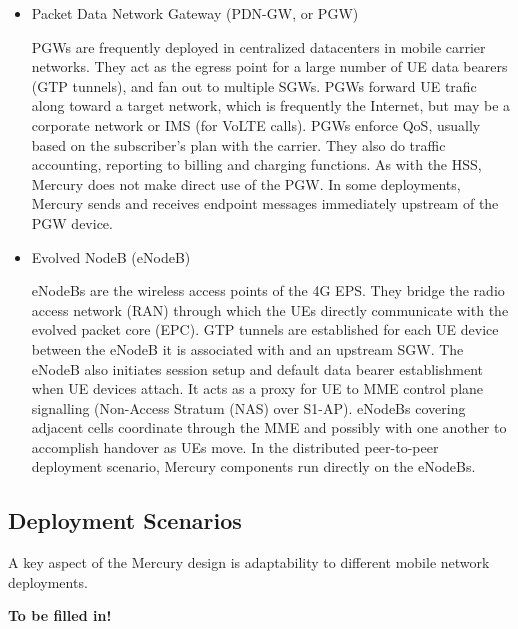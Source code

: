 \begin{itemize}
\item Packet Data Network Gateway (PDN-GW, or PGW)

PGWs are frequently deployed in centralized datacenters in mobile
carrier networks.  They act as the egress point for a large number of
UE data bearers (GTP tunnels), and fan out to multiple SGWs. PGWs
forward UE trafic along toward a target network, which is frequently
the Internet, but may be a corporate network or IMS (for VoLTE
calls). PGWs enforce QoS, usually based on the subscriber's plan with
the carrier. They also do traffic accounting, reporting to billing and
charging functions. As with the HSS, Mercury does not make direct use
of the PGW. In some deployments, Mercury sends and receives endpoint
messages immediately upstream of the PGW device.

\item Evolved NodeB (eNodeB)

eNodeBs are the wireless access points of the 4G EPS. They bridge the
radio access network (RAN) through which the UEs directly communicate
with the evolved packet core (EPC). GTP tunnels are established for
each UE device between the eNodeB it is associated with and an
upstream SGW.  The eNodeB also initiates session setup and default
data bearer establishment when UE devices attach. It acts as a proxy
for UE to MME control plane signalling (Non-Access Stratum (NAS) over
S1-AP). eNodeBs covering adjacent cells coordinate through the MME and
possibly with one another to accomplish handover as UEs move. In the
distributed peer-to-peer deployment scenario, Mercury components run
directly on the eNodeBs.

\end{itemize}

\subsection{Deployment Scenarios}

A key aspect of the Mercury design is adaptability to different mobile
network deployments.

{\bf To be filled in!}

